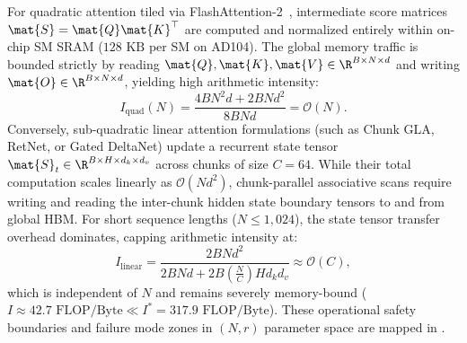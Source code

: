 For quadratic attention tiled via FlashAttention-2~\cite{dao2023flashattention2}, intermediate score matrices $\mat{S} = \mat{Q}\mat{K}^\top$ are computed and normalized entirely within on-chip SM SRAM ($128\text{ KB}$ per SM on AD104). The global memory traffic is bounded strictly by reading $\mat{Q}, \mat{K}, \mat{V} \in \R^{B \times N \times d}$ and writing $\mat{O} \in \R^{B \times N \times d}$, yielding high arithmetic intensity:
\begin{equation}
I_{\text{quad}}(N) = \frac{4 B N^2 d + 2 B N d^2}{8 B N d} = \mathcal{O}(N).
\end{equation}
Conversely, sub-quadratic linear attention formulations (such as Chunk GLA, RetNet, or Gated DeltaNet) update a recurrent state tensor $\mat{S}_t \in \R^{B \times H \times d_k \times d_v}$ across chunks of size $C = 64$. While their total computation scales linearly as $\mathcal{O}(N d^2)$, chunk-parallel associative scans require writing and reading the inter-chunk hidden state boundary tensors to and from global HBM. For short sequence lengths ($N \le 1{,}024$), the state tensor transfer overhead dominates, capping arithmetic intensity at:
\begin{equation}
I_{\text{linear}} = \frac{2 B N d^2}{2 B N d + 2 B \left(\frac{N}{C}\right) H d_k d_v} \approx \mathcal{O}(C),
\end{equation}
which is independent of $N$ and remains severely memory-bound ($I \approx 42.7\text{ FLOP/Byte} \ll I^* = 317.9\text{ FLOP/Byte}$). These operational safety boundaries and failure mode zones in $(N, r)$ parameter space are mapped in .

